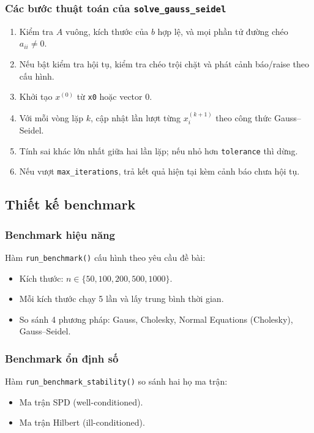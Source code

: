 \documentclass[a4paper]{article}
\begin{document}
\subsubsection{Các bước thuật toán của \texttt{solve\_gauss\_seidel}}

\begin{enumerate}
    \item Kiểm tra $A$ vuông, kích thước của $b$ hợp lệ, và mọi phần tử đường chéo $a_{ii}\neq 0$.
    \item Nếu bật kiểm tra hội tụ, kiểm tra chéo trội chặt và phát cảnh báo/raise theo cấu hình.
    \item Khởi tạo $x^{(0)}$ từ \texttt{x0} hoặc vector 0.
    \item Với mỗi vòng lặp $k$, cập nhật lần lượt từng $x_i^{(k+1)}$ theo công thức Gauss--Seidel.
    \item Tính sai khác lớn nhất giữa hai lần lặp; nếu nhỏ hơn \texttt{tolerance} thì dừng.
    \item Nếu vượt \texttt{max\_iterations}, trả kết quả hiện tại kèm cảnh báo chưa hội tụ.
\end{enumerate}

\subsection{Thiết kế benchmark}

\subsubsection{Benchmark hiệu năng}

Hàm \texttt{run\_benchmark()} cấu hình theo yêu cầu đề bài:
\begin{itemize}
    \item Kích thước: $n \in \{50,100,200,500,1000\}$.
    \item Mỗi kích thước chạy 5 lần và lấy trung bình thời gian.
    \item So sánh 4 phương pháp: Gauss, Cholesky, Normal Equations (Cholesky), Gauss--Seidel.
\end{itemize}

\subsubsection{Benchmark ổn định số}

Hàm \texttt{run\_benchmark\_stability()} so sánh hai họ ma trận:
\begin{itemize}
    \item Ma trận SPD (well-conditioned).
    \item Ma trận Hilbert (ill-conditioned).
\end{itemize}
\end{document}
